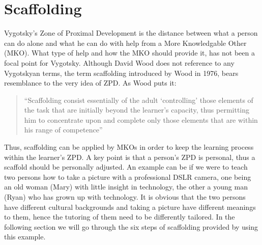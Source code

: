 \section{Scaffolding}
Vygotsky’s Zone of Proximal Development is the distance between what a person can do alone and what he can do with help from a More Knowledgable Other (MKO). What type of help and how the MKO should provide it, has not been a focal point for Vygotsky. Although David Wood does not reference to any Vygotskyan terms, the term scaffolding introduced by Wood in 1976, bears resemblance to the very idea of ZPD. As Wood puts it:

\begin{quote}“Scaffolding consist essentially of the adult ‘controlling’ those elements of the task that are initially beyond the learner’s capacity, thus permitting him to concentrate upon and complete only those elements that are within his range of competence” \citep{wood1976role}
\end{quote}

Thus, scaffolding can be applied by MKOs in order to keep the learning process within the learner’s ZPD. A key point is that a person's ZPD is personal, thus a scaffold should be personally adjusted. An example can be if we were to teach two persons how to take a picture with a professional DSLR camera, one being an old woman (Mary) with little insight in technology, the other a young man (Ryan) who has grown up with technology. It is obvious that the two persons have different cultural backgrounds and taking a picture have different meanings to them, hence the tutoring of them need to be differently tailored. In the following section we will go through the six steps of scaffolding provided by \citet{wood1976role} using this example.

